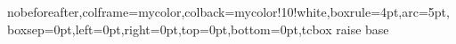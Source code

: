 \usepackage{color}

\usepackage{tcolorbox}

\newtcbox{\mybox}
{nobeforeafter,colframe=mycolor,colback=mycolor!10!white,boxrule=4pt,arc=5pt,
	boxsep=0pt,left=0pt,right=0pt,top=0pt,bottom=0pt,tcbox raise base}